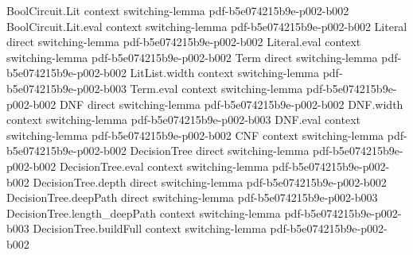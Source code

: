 \begin{theorem}
\label{thm:switching_lemma}
\label{SwitchingLemma.switching_lemma}
\proofstep
  {BoolCircuit.Lit}
  {context}
  {switching-lemma}
  {pdf-b5e074215b9e-p002-b002}
\proofstep
  {BoolCircuit.Lit.eval}
  {context}
  {switching-lemma}
  {pdf-b5e074215b9e-p002-b002}
\proofstep
  {Literal}
  {direct}
  {switching-lemma}
  {pdf-b5e074215b9e-p002-b002}
\proofstep
  {Literal.eval}
  {context}
  {switching-lemma}
  {pdf-b5e074215b9e-p002-b002}
\proofstep
  {Term}
  {direct}
  {switching-lemma}
  {pdf-b5e074215b9e-p002-b002}
\proofstep
  {LitList.width}
  {context}
  {switching-lemma}
  {pdf-b5e074215b9e-p002-b003}
\proofstep
  {Term.eval}
  {context}
  {switching-lemma}
  {pdf-b5e074215b9e-p002-b002}
\proofstep
  {DNF}
  {direct}
  {switching-lemma}
  {pdf-b5e074215b9e-p002-b002}
\proofstep
  {DNF.width}
  {context}
  {switching-lemma}
  {pdf-b5e074215b9e-p002-b003}
\proofstep
  {DNF.eval}
  {context}
  {switching-lemma}
  {pdf-b5e074215b9e-p002-b002}
\proofstep
  {CNF}
  {context}
  {switching-lemma}
  {pdf-b5e074215b9e-p002-b002}
\proofstep
  {DecisionTree}
  {direct}
  {switching-lemma}
  {pdf-b5e074215b9e-p002-b002}
\proofstep
  {DecisionTree.eval}
  {context}
  {switching-lemma}
  {pdf-b5e074215b9e-p002-b002}
\proofstep
  {DecisionTree.depth}
  {direct}
  {switching-lemma}
  {pdf-b5e074215b9e-p002-b002}
\proofstep
  {DecisionTree.deepPath}
  {direct}
  {switching-lemma}
  {pdf-b5e074215b9e-p002-b003}
\proofstep
  {DecisionTree.length_deepPath}
  {context}
  {switching-lemma}
  {pdf-b5e074215b9e-p002-b003}
\proofstep
  {DecisionTree.buildFull}
  {context}
  {switching-lemma}
  {pdf-b5e074215b9e-p002-b002}

\end{theorem}
